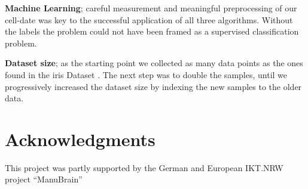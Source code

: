 \documentclass[5p,times,procedia]{elsarticle}
\begin{document}
\textbf{Machine Learning}; careful measurement and  meaningful preprocessing
of our cell-date was key to the successful application of all three algorithms.
Without the labels the problem could not have been framed as a supervised 
classification problem.

\textbf{Dataset size}; as the starting point we collected as many data points as the ones found in the iris Dataset \cite{fisher_1936}. The next step was to double the samples, until we progressively increased the dataset size by indexing the new samples to the older data. 

\section*{Acknowledgments}
This project was partly supported by the German and European IKT.NRW
project "`ManuBrain"' 



\end{document}
